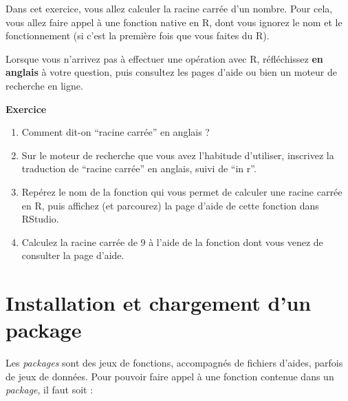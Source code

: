 \documentclass[
  11pt,
]{book}
\newcommand{\VERB}{\Verb[commandchars=\\\{\}]}
\newcommand{\FunctionTok}[1]{\textcolor[rgb]{0.00,0.00,0.00}{#1}}
\newcommand{\NormalTok}[1]{#1}
\newcommand{\SpecialCharTok}[1]{\textcolor[rgb]{0.00,0.00,0.00}{#1}}
\newcommand{\StringTok}[1]{\textcolor[rgb]{0.31,0.60,0.02}{#1}}
\providecommand{\tightlist}{%
  \setlength{\itemsep}{0pt}\setlength{\parskip}{0pt}}
\numberwithin{equation}{section}
\numberwithin{countremarque}{section}
\newenvironment{notebox}{
  \begin{tcolorbox}[breakable, colback=jaune,coltext=black,
                  colframe=grisfonce]}
 {\end{tcolorbox}}
\newenvironment{greenbox}{
  \begin{tcolorbox}[breakable, colback=vert,coltext=black,
                  colframe=grisfonce]}
 {\end{tcolorbox}}
\begin{document}
Dans cet exercice, vous allez calculer la racine carrée d'un nombre. Pour cela, vous allez faire appel à une fonction native en R, dont vous ignorez le nom et le fonctionnement (si c'est la première fois que vous faites du R).

\begin{notebox}
Lorsque vous n'arrivez pas à effectuer une opération avec R, réfléchissez \textbf{en anglais} à votre question, puis consultez les pages d'aide ou bien un moteur de recherche en ligne.

\end{notebox}

\begin{greenbox}

\textbf{Exercice}

\begin{enumerate}
\def\labelenumi{\arabic{enumi}.}
\tightlist
\item
  Comment dit-on ``racine carrée'' en anglais ?
\item
  Sur le moteur de recherche que vous avez l'habitude d'utiliser, inscrivez la traduction de ``racine carrée'' en anglais, suivi de ``in r''.
\item
  Repérez le nom de la fonction qui vous permet de calculer une racine carrée en R, puis affichez (et parcourez) la page d'aide de cette fonction dans RStudio.
\item
  Calculez la racine carrée de 9 à l'aide de la fonction dont vous venez de consulter la page d'aide.
\end{enumerate}

\end{greenbox}

\hypertarget{installation-et-chargement-dun-package}{%
\section{Installation et chargement d'un package}\label{installation-et-chargement-dun-package}}

Les \emph{packages} sont des jeux de fonctions, accompagnés de fichiers d'aides, parfois de jeux de données. Pour pouvoir faire appel à une fonction contenue dans un \emph{package}, il faut soit :

\end{document}
